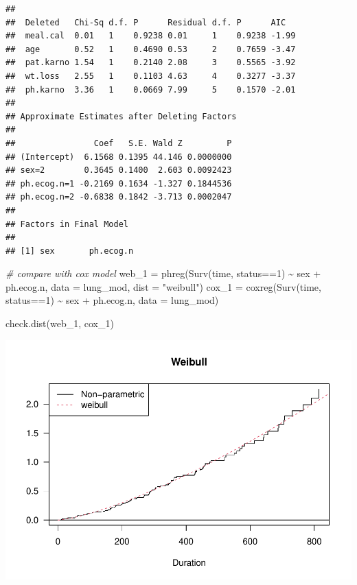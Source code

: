 \documentclass[
]{article}
\newenvironment{Shaded}{\begin{snugshade}}{\end{snugshade}}
\newcommand{\AttributeTok}[1]{\textcolor[rgb]{0.77,0.63,0.00}{#1}}
\newcommand{\CommentTok}[1]{\textcolor[rgb]{0.56,0.35,0.01}{\textit{#1}}}
\newcommand{\DecValTok}[1]{\textcolor[rgb]{0.00,0.00,0.81}{#1}}
\newcommand{\FunctionTok}[1]{\textcolor[rgb]{0.00,0.00,0.00}{#1}}
\newcommand{\NormalTok}[1]{#1}
\newcommand{\OtherTok}[1]{\textcolor[rgb]{0.56,0.35,0.01}{#1}}
\newcommand{\SpecialCharTok}[1]{\textcolor[rgb]{0.00,0.00,0.00}{#1}}
\newcommand{\StringTok}[1]{\textcolor[rgb]{0.31,0.60,0.02}{#1}}
\begin{document}
\begin{verbatim}
## 
##  Deleted   Chi-Sq d.f. P      Residual d.f. P      AIC  
##  meal.cal  0.01   1    0.9238 0.01     1    0.9238 -1.99
##  age       0.52   1    0.4690 0.53     2    0.7659 -3.47
##  pat.karno 1.54   1    0.2140 2.08     3    0.5565 -3.92
##  wt.loss   2.55   1    0.1103 4.63     4    0.3277 -3.37
##  ph.karno  3.36   1    0.0669 7.99     5    0.1570 -2.01
## 
## Approximate Estimates after Deleting Factors
## 
##                Coef   S.E. Wald Z         P
## (Intercept)  6.1568 0.1395 44.146 0.0000000
## sex=2        0.3645 0.1400  2.603 0.0092423
## ph.ecog.n=1 -0.2169 0.1634 -1.327 0.1844536
## ph.ecog.n=2 -0.6838 0.1842 -3.713 0.0002047
## 
## Factors in Final Model
## 
## [1] sex       ph.ecog.n
\end{verbatim}

\begin{Shaded}
\begin{Highlighting}[]
\CommentTok{\# compare with cox model}
\NormalTok{web\_1 }\OtherTok{=} \FunctionTok{phreg}\NormalTok{(}\FunctionTok{Surv}\NormalTok{(time, status}\SpecialCharTok{==}\DecValTok{1}\NormalTok{) }\SpecialCharTok{\textasciitilde{}}\NormalTok{ sex }\SpecialCharTok{+}\NormalTok{ ph.ecog.n,}
                      \AttributeTok{data =}\NormalTok{ lung\_mod, }\AttributeTok{dist =} \StringTok{"weibull"}\NormalTok{)}
\NormalTok{cox\_1 }\OtherTok{=} \FunctionTok{coxreg}\NormalTok{(}\FunctionTok{Surv}\NormalTok{(time, status}\SpecialCharTok{==}\DecValTok{1}\NormalTok{) }\SpecialCharTok{\textasciitilde{}}\NormalTok{ sex }\SpecialCharTok{+}\NormalTok{ ph.ecog.n, }\AttributeTok{data =}\NormalTok{ lung\_mod)}

\FunctionTok{check.dist}\NormalTok{(web\_1, cox\_1)}
\end{Highlighting}
\end{Shaded}

\includegraphics{final_project_files/figure-latex/unnamed-chunk-41-1.pdf}
\end{document}
